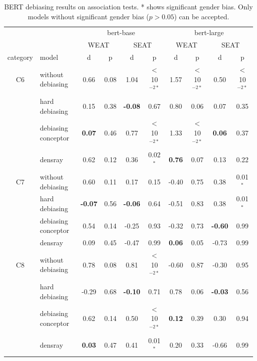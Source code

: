 \begin{table}[h]
	\centering
	\footnotesize
	\begin{tabular}{cl{|}cccc{|}cccc}
		\hline
		&&\multicolumn{4}{c|}{bert-base}&\multicolumn{4}{c}{bert-large}\\
		&&\multicolumn{2}{c}{WEAT}&\multicolumn{2}{c|}{SEAT}&\multicolumn{2}{c}{WEAT}&\multicolumn{2}{c}{SEAT}\\
		\hline
		category & model & d & p& d & p& d & p& d & p\\
		\hline
		C6 & without debiasing & 0.66 & 0.08 &1.04&$<$10$^{-2*}$& 1.57 & $<$10$^{-2*}$ &0.50&$<$10$^{-2*}$\\
		& hard debiasing& 0.15 & 0.38&\textbf{-0.08}&0.67& 0.80 & 0.06&0.07&0.35\\
		& debiasing conceptor & \textbf{0.07} & 0.46&0.77&$<$10$^{-2*}$ & 1.33 & $<$10$^{-2*}$&\textbf{0.06}&0.37\\
		&densray & 0.62 & 0.12&0.36&0.02$^{*}$ & \textbf{0.76} & 0.07&0.13&0.22\\
		\hline
		C7 & without debiasing & 0.60 & 0.11 &0.17&0.15 & -0.40 & 0.75 &0.38&0.01$^{*}$\\
		& hard debiasing & \textbf{-0.07} & 0.56&\textbf{-0.06}&0.64 & -0.51 & 0.83&0.38&0.01$^{*}$\\
		& debiasing conceptor & 0.54 & 0.14&-0.25&0.93 & -0.32 & 0.73&\textbf{-0.60}&0.99\\
		& densray & 0.09 & 0.45&-0.47&0.99 & \textbf{0.06} & 0.05&-0.73&0.99\\
		\hline
		C8& without debiasing & 0.78 & 0.08 &0.81&$<$10$^{-2*}$ & -0.60 & 0.87 &-0.30&0.95\\
		& hard debiasing & -0.29 & 0.68&\textbf{-0.10}&0.71 & 0.78 & 0.06&\textbf{-0.03}&0.56\\
		& debiasing conceptor & 0.62 & 0.14&0.50&$<$10$^{-2*}$& \textbf{0.12} & 0.39&0.30&0.94\\
		& densray & \textbf{0.03} & 0.47&0.41&0.01$^{*}$ & 0.20 & 0.33&-0.66&0.99\\
		\hline
	\end{tabular}
	\caption{
		BERT debiasing results on association tests. * shows significant gender bias. Only models without significant gender bias ($p>0.05$) can be accepted.}
\end{table}

